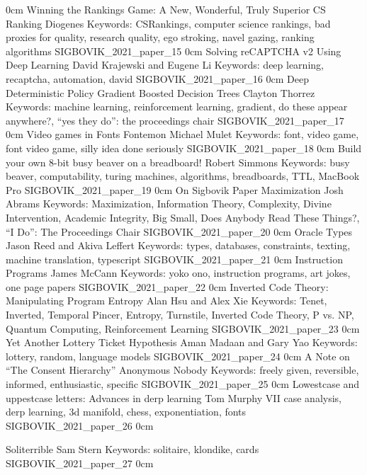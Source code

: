 	{0cm}
	{}
\addpaper
	{Winning the Rankings Game: A New, Wonderful, Truly Superior CS Ranking}
	{Diogenes}
	{Keywords: CSRankings, computer science rankings, bad proxies for quality, research quality, ego stroking, navel gazing, ranking algorithms}
	{SIGBOVIK_2021_paper_15}
	{0cm}
	{}
\addpaper
	{Solving reCAPTCHA v2 Using Deep Learning}
	{David Krajewski and Eugene Li}
	{Keywords: deep learning, recaptcha, automation, david}
	{SIGBOVIK_2021_paper_16}
	{0cm}
	{}
\addpaper
	{Deep Deterministic Policy Gradient Boosted Decision Trees}
	{Clayton Thorrez}
	{Keywords: machine learning, reinforcement learning, gradient, do these appear anywhere?, ``yes they do'': the proceedings chair}
	{SIGBOVIK_2021_paper_17}
	{0cm}
	{}
\addpaper
	{Video games in Fonts Fontemon}
	{Michael Mulet}
	{Keywords: font, video game, font video game, silly idea done seriously}
	{SIGBOVIK_2021_paper_18}
	{0cm}
	{}
\addpaper
	{Build your own 8-bit busy beaver on a breadboard!}
	{Robert Simmons}
	{Keywords: busy beaver, computability, turing machines, algorithms, breadboards, TTL, MacBook Pro}
	{SIGBOVIK_2021_paper_19}
	{0cm}
	{}
\addpaper
	{On Sigbovik Paper Maximization}
	{Josh Abrams}
	{Keywords: Maximization, Information Theory, Complexity, Divine Intervention, Academic Integrity, Big Small, Does Anybody Read These Things?, ``I Do'': The Proceedings Chair}
	{SIGBOVIK_2021_paper_20}
	{0cm}
	{}
\addpaper
	{Oracle Types}
	{Jason Reed and Akiva Leffert}
	{Keywords: types, databases, constraints, texting, machine translation, typescript}
	{SIGBOVIK_2021_paper_21}
	{0cm}
	{}
\addpaper
	{Instruction Programs}
	{James McCann}
	{Keywords: yoko ono, instruction programs, art jokes, one page papers}
	{SIGBOVIK_2021_paper_22}
	{0cm}
	{}
\addpaper
	{Inverted Code Theory: Manipulating Program Entropy}
	{Alan Hsu and Alex Xie}
	{Keywords: Tenet, Inverted, Temporal Pincer, Entropy, Turnstile, Inverted Code Theory, P vs. NP, Quantum Computing, Reinforcement Learning}
	{SIGBOVIK_2021_paper_23}
	{0cm}
	{}
\addpaper
	{Yet Another Lottery Ticket Hypothesis}
	{Aman Madaan and Gary Yao}
	{Keywords: lottery, random, language models}
	{SIGBOVIK_2021_paper_24}
	{0cm}
	{}
\addpaper
	{A Note on ``The Consent Hierarchy''}
	{Anonymous Nobody}
	{Keywords: freely given, reversible, informed, enthusiastic, specific}
	{SIGBOVIK_2021_paper_25}
	{0cm}
	{}
\addpaper
	{Lowestcase and uppestcase letters: Advances in derp learning}
	{Tom Murphy VII}
	{case analysis, derp learning, 3d manifold, chess, exponentiation, fonts}
	{SIGBOVIK_2021_paper_26}
	{0cm}
	{}

\addpaper
	{Soliterrible}
	{Sam Stern}
	{Keywords: solitaire, klondike, cards}
	{SIGBOVIK_2021_paper_27}
	{0cm}
	{}

